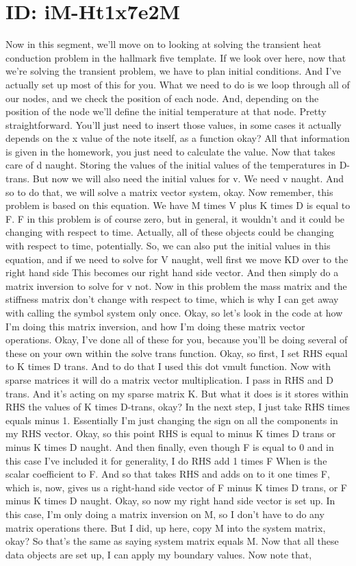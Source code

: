 \documentclass[10pt]{article}
\begin{document}
\section*{ID: iM-Ht1x7e2M}
Now in this segment, we'll move on to looking at solving the transient heat conduction problem in the hallmark five template. If we look over here, now that we're solving the transient problem, we have to plan initial conditions. And I've actually set up most of this for you. What we need to do is we loop through all of our nodes, and we check the position of each node. And, depending on the position of the node we'll define the initial temperature at that node. Pretty straightforward. You'll just need to insert those values, in some cases it actually depends on the x value of the note itself, as a function okay? All that information is given in the homework, you just need to calculate the value. Now that takes care of d naught. Storing the values of the initial values of the temperatures in D-trans. But now we will also need the initial values for v. We need v naught. And so to do that, we will solve a matrix vector system, okay. Now remember, this problem is based on this equation. We have M times V plus K times D is equal to F. F in this problem is of course zero, but in general, it wouldn't and it could be changing with respect to time. Actually, all of these objects could be changing with respect to time, potentially. So, we can also put the initial values in this equation, and if we need to solve for V naught, well first we move KD over to the right hand side This becomes our right hand side vector. And then simply do a matrix inversion to solve for v not. Now in this problem the mass matrix and the stiffness matrix don't change with respect to time, which is why I can get away with calling the symbol system only once. Okay, so let's look in the code at how I'm doing this matrix inversion, and how I'm doing these matrix vector operations. Okay, I've done all of these for you, because you'll be doing several of these on your own within the solve trans function. Okay, so first, I set RHS equal to K times D trans. And to do that I used this dot vmult function. Now with sparse matrices it will do a matrix vector multiplication. I pass in RHS and D trans. And it's acting on my sparse matrix K. But what it does is it stores within RHS the values of K times D-trans, okay? In the next step, I just take RHS times equals minus 1. Essentially I'm just changing the sign on all the components in my RHS vector. Okay, so this point RHS is equal to minus K times D trans or minus K times D naught. And then finally, even though F is equal to 0 and in this case I've included it for generality, I do RHS add 1 times F When is the scalar coefficient to F. And so that takes RHS and adds on to it one times F, which is, now, gives us a right-hand side vector of F minus K times D trans, or F minus K times D naught. Okay, so now my right hand side vector is set up. In this case, I'm only doing a matrix inversion on M, so I don't have to do any matrix operations there. But I did, up here, copy M into the system matrix, okay? So that's the same as saying system matrix equals M. Now that all these data objects are set up, I can apply my boundary values. Now note that, 
\end{document}
